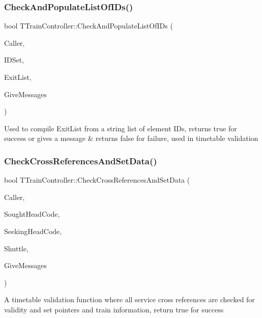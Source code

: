 \subsubsection{\texorpdfstring{Check\+And\+Populate\+List\+Of\+I\+Ds()}{CheckAndPopulateListOfIDs()}}
{\footnotesize\ttfamily bool T\+Train\+Controller\+::\+Check\+And\+Populate\+List\+Of\+I\+Ds (\begin{DoxyParamCaption}\item[{int}]{Caller,  }\item[{Ansi\+String}]{I\+D\+Set,  }\item[{T\+Exit\+List \&}]{Exit\+List,  }\item[{bool}]{Give\+Messages }\end{DoxyParamCaption})}

Used to compile Exit\+List from a string list of element I\+Ds, returns true for success or gives a message \& returns false for failure, used in timetable validation \mbox{\label{class_t_train_controller_a72662be9ecd0e95131779bd10b6fe14f}} 
\subsubsection{\texorpdfstring{Check\+Cross\+References\+And\+Set\+Data()}{CheckCrossReferencesAndSetData()}}
{\footnotesize\ttfamily bool T\+Train\+Controller\+::\+Check\+Cross\+References\+And\+Set\+Data (\begin{DoxyParamCaption}\item[{int}]{Caller,  }\item[{Ansi\+String}]{Sought\+Head\+Code,  }\item[{Ansi\+String}]{Seeking\+Head\+Code,  }\item[{bool}]{Shuttle,  }\item[{bool}]{Give\+Messages }\end{DoxyParamCaption})}

A timetable validation function where all service cross references are checked for validity and set pointers and train information, return true for success \mbox{\label{class_t_train_controller_aa991976bc8ea956f9e9230f6a6921ac1}} 
